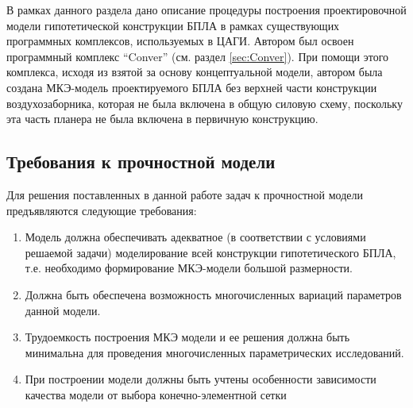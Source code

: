 
В рамках данного раздела дано описание процедуры построения проектировочной модели гипотетической конструкции БПЛА в рамках существующих программных комплексов, используемых в ЦАГИ. Автором был освоен программный комплекс ``Conver'' \cite{ConverICAS}\cite{ConverNice} (см. раздел \ref{sec:Conver}). 
При помощи этого комплекса, исходя из взятой за основу концептуальной модели, автором была создана МКЭ-модель проектируемого БПЛА без верхней части конструкции воздухозаборника, которая не была включена в общую силовую схему, поскольку эта часть планера не была включена в первичную конструкцию.




\subsection{Требования к прочностной модели}

Для решения поставленных в данной работе задач к прочностной модели предъявляются следующие требования:



\begin{enumerate}
\item Модель должна обеспечивать адекватное (в соответствии с условиями решаемой задачи) моделирование всей конструкции гипотетического БПЛА, т.е. необходимо формирование МКЭ-модели большой размерности.
\item Должна быть обеспечена возможность многочисленных вариаций параметров данной модели.
\item Трудоемкость построения МКЭ модели и ее решения должна быть минимальна для проведения многочисленных параметрических исследований.
\item При построении модели должны быть учтены особенности зависимости качества модели от выбора конечно-элементной сетки
\end{enumerate}

